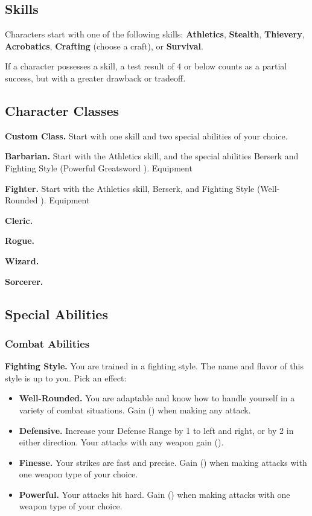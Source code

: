 \documentclass[10pt,twoside,twocolumn,openany]{book}
\begin{document}
\subsection{Skills}
Characters start with one of the following skills:
\textbf{Athletics}, \textbf{Stealth}, \textbf{Thievery}, \textbf{Acrobatics}, \textbf{Crafting} (choose a craft), or \textbf{Survival}.
\par If a character possesses a skill, a test result of 4 or below counts as a partial success, but with a greater drawback or tradeoff.

\subsection{Character Classes}
\par \textbf{Custom Class.} Start with one skill and two special abilities of your choice.
\par \textbf{Barbarian.} Start with the Athletics skill, and the special abilities Berserk and Fighting Style (Powerful Greatsword \shiftright\shiftright). Equipment
\par \textbf{Fighter.} Start with the Athletics skill, Berserk, and Fighting Style (Well-Rounded \shiftout). Equipment
\par \textbf{Cleric.}
\par \textbf{Rogue.}
\par \textbf{Wizard.}
\par \textbf{Sorcerer.}


\subsection{Special Abilities}
\subsubsection{Combat Abilities}
\par \textbf{Fighting Style.} You are trained in a fighting style. The name and flavor of this style is up to you. Pick an effect:
\begin{itemize}
\item \textbf{Well-Rounded.} You are adaptable and know how to handle yourself in a variety of combat situations. Gain (\shiftout) when making any attack.
\item \textbf{Defensive.} Increase your Defense Range by 1 to left and right, or by 2 in either direction. Your attacks with any weapon gain (\shiftcenter).
\item \textbf{Finesse.} Your strikes are fast and precise. Gain (\shiftleft\shiftleft) when making attacks with one weapon type of your choice.
\item \textbf{Powerful.} Your attacks hit hard. Gain (\shiftright\shiftright) when making attacks with one weapon type of your choice.
\end{itemize}
\end{document}
